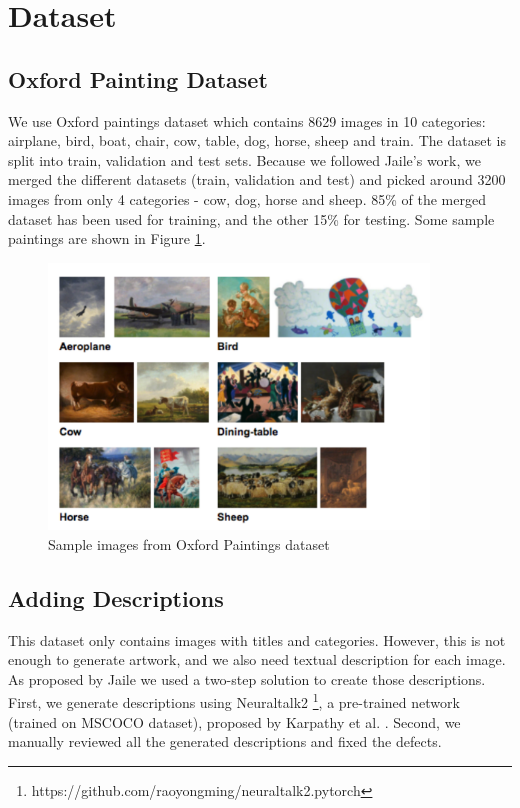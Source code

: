 \documentclass[a4paper]{article}
\begin{document}
\section{Dataset}
\subsection{Oxford Painting Dataset}
We use Oxford paintings dataset \cite{Crowley14,Crowley14a} which contains 8629 images in 10 categories: airplane, bird, boat, chair, cow, table, dog, horse, sheep and train. The dataset is split into train, validation and test sets. Because we followed Jaile's work, we merged the different datasets (train, validation and test) and picked around 3200 images from only 4 categories - cow, dog, horse and sheep. 85\% of the merged dataset has been used for training, and the other 15\% for testing. Some
sample paintings are shown in Figure \ref{fig:oxford}.

\begin{figure}[ht]
    \centering
    \includegraphics[width=0.9\textwidth]{oxford.png}
    \caption{Sample images from Oxford Paintings dataset}
    \label{fig:oxford}
\end{figure}

\subsection{Adding Descriptions}
This dataset only contains images with titles and categories. However, this is not enough to generate artwork, and we also need textual description for each image.
As proposed by Jaile we used a two-step solution to create those descriptions. First, we generate descriptions using Neuraltalk2 \footnote{https://github.com/raoyongming/neuraltalk2.pytorch}, a pre-trained network (trained on MSCOCO dataset), proposed by Karpathy et al. \cite{karpathy2015deep}. Second, we manually reviewed all the generated descriptions and fixed the defects.
\end{document}
